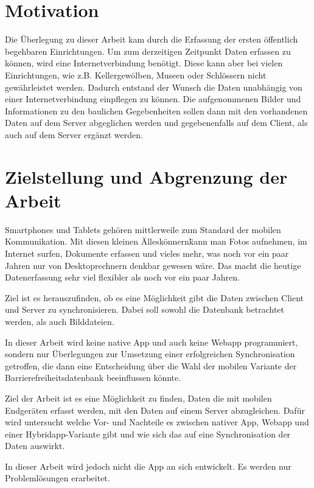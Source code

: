 \section{Motivation}
\label{sec:motivation:mot}

Die Überlegung zu dieser Arbeit kam durch die Erfassung der ersten öffentlich begehbaren Einrichtungen. Um zum derzeitigen Zeitpunkt Daten erfassen zu können, wird eine Internetverbindung benötigt. Diese kann aber bei vielen Einrichtungen, wie z.B. Kellergewölben, Museen oder Schlössern nicht gewährleistet werden. Dadurch entstand der Wunsch die Daten unabhängig von einer Internetverbindung einpflegen zu können. Die aufgenommenen Bilder und Informationen zu den baulichen Gegebenheiten sollen dann mit den vorhandenen Daten auf dem Server abgeglichen werden und gegebenenfalls auf dem Client, als auch auf dem Server ergänzt werden.

\section{Zielstellung und Abgrenzung der Arbeit}
\label{sec:goal:goal}

Smartphones und Tablets gehören mittlerweile zum Standard der mobilen Kommunikation. Mit diesen kleinen \"Alleskönnern\" kann man Fotos aufnehmen, im Internet surfen, Dokumente erfassen und vieles mehr, was noch vor ein paar Jahren nur von Desktoprechnern denkbar gewesen wäre. Das macht die heutige Datenerfassung sehr viel flexibler als noch vor ein paar Jahren.

Ziel ist es herauszufinden, ob es eine Möglichkeit gibt die Daten zwischen Client und Server zu synchronisieren. Dabei soll sowohl die Datenbank betrachtet werden, als auch Bilddateien.

In dieser Arbeit wird keine native App und auch keine Webapp programmiert, sondern nur Überlegungen zur Umsetzung einer erfolgreichen Synchronisation getroffen, die dann eine Entscheidung über die Wahl der mobilen Variante der Barrierefreiheitsdatenbank beeinflussen könnte.

Ziel der Arbeit ist es eine Möglichkeit zu finden, Daten die mit mobilen Endgeräten erfasst werden, mit den Daten auf einem Server abzugleichen. Dafür wird untersucht welche Vor- und Nachteile es zwischen nativer App, Webapp und einer Hybridapp-Variante gibt und wie sich das auf eine Synchronisation der Daten auswirkt.

In dieser Arbeit wird jedoch nicht die App an sich entwickelt. Es werden nur Problemlösungen erarbeitet.

